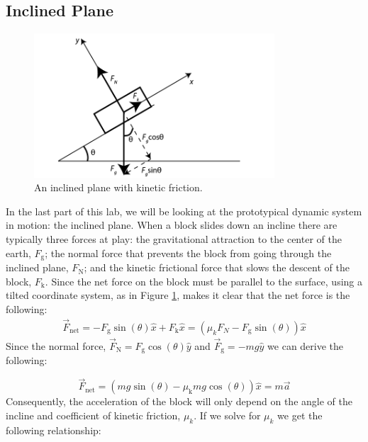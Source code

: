 \subsection{Inclined Plane}
\begin{figure}[h]
    \begin{center}
        \includegraphics[width=0.8\textwidth]{./Exp1-4/pic/image16.png}
    \end{center}
    \caption{An inclined plane with kinetic friction.}
    \label{fig:plane}
\end{figure}
In the last part of this lab, we will be looking at the prototypical dynamic system in motion: the inclined plane.  When a block slides down an incline there are typically three forces at play: the gravitational attraction to the center of the earth, $F_\text{g}$; the normal force that prevents the block from going through the inclined plane, $F_\text{N}$; and the kinetic frictional force that slows the descent of the block, $F_\text{k}$.  Since the net force on the block must be parallel to the surface, using a tilted coordinate system, as in Figure \ref{fig:plane}, makes it clear that the net force is the following:
\begin{gather}
\vec F_{\text{net}} = - F_{\text{g}} \sin(\theta) \hat x + F_{\text{k}} \hat x = \left ( \mu_k F_N-F_{\text{g}} \sin(\theta)\right ) \hat x
\end{gather}
Since the normal force, $\vec F_\text{N} = F_\text{g} \cos(\theta) \hat y$ and $\vec F_\text{g} = -m g \hat y$ we can derive the following:

\begin{equation}
\vec F_{\text{net}} = \left ( mg \sin(\theta) - \mu_\text{k} m g \cos(\theta) \right ) \hat x= m\vec a
\end{equation}
\noindent Consequently, the acceleration of the block will only depend on the angle of the incline and coefficient of kinetic friction, $\mu_k$. If we solve for $\mu_k$ we get the following relationship:

